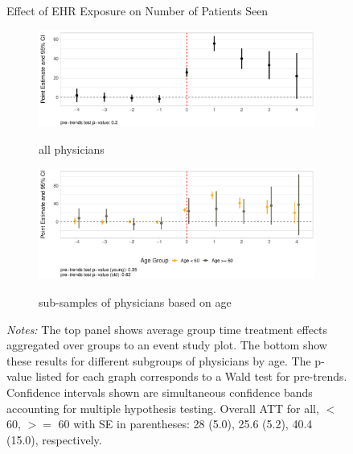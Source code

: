 \documentclass[12pt]{article}
\begin{document}
\begin{figure}[ht!]
\centering
    \captionsetup{width=.7\linewidth}
    \caption{Effect of EHR Exposure on Number of Patients Seen}
   \begin{subfigure}[]{.8\textwidth}
   \caption{all physicians}
   \includegraphics[scale=.45]{Objects/patient_plot_all.pdf}
   \label{fig:patienta} 
\end{subfigure}

\vspace{3mm}

\begin{subfigure}[]{.8\textwidth}
\caption{sub-samples of physicians based on age}
   \includegraphics[scale=.45]{Objects/patient_plot_ages.pdf}
   \label{fig:patientb}
\end{subfigure}
\vspace{2mm}
    \caption*{\footnotesize{\textit{Notes:} The top panel shows average group time treatment effects aggregated over groups to an event study plot. The bottom show these results for different subgroups of physicians by age. The p-value listed for each graph corresponds to a Wald test for pre-trends. Confidence intervals shown are simultaneous confidence bands accounting for multiple hypothesis testing. Overall ATT for all, $<$ 60, $>=$ 60 with SE in parentheses: 28 (5.0), 25.6 (5.2), 40.4 (15.0), respectively.}}
\end{figure}
\end{document}
